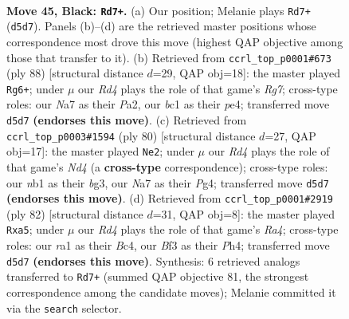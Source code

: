 \documentclass[11pt]{article}
\begin{document}
\clearpage

\begin{figure}[p]\centering
\begin{subfigure}{0.46\textwidth}\centering
\resizebox{\linewidth}{!}{%
\newchessgame
\chessboard[
  setfen={7k/n1P2K1p/p7/P2r1p2/4p3/5bP1/8/RNB5 b - - 0 45},
  showmover=false,
  pgfstyle=straightmove, color=movearrow, markmove={d5-d7}
]}
\caption{}
\end{subfigure}\hfill
\begin{subfigure}{0.46\textwidth}\centering
\resizebox{\linewidth}{!}{%
\newchessgame
\chessboard[
  setfen={8/6R1/1n1k4/1r4p1/4p3/4P2P/P4PP1/6K1 w - - 8 45},
  showmover=false,
  pgfstyle=straightmove, color=movearrow, markmove={g7-g6}
]}
\caption{}
\end{subfigure}
\\[4pt]
\begin{subfigure}{0.46\textwidth}\centering
\resizebox{\linewidth}{!}{%
\newchessgame
\chessboard[
  setfen={4r3/p2R4/2p3k1/8/2PN2P1/1P2p1b1/P7/1K6 w - - 5 41},
  showmover=false,
  pgfstyle=straightmove, color=movearrow, markmove={d4-e2}
]}
\caption{}
\end{subfigure}\hfill
\begin{subfigure}{0.46\textwidth}\centering
\resizebox{\linewidth}{!}{%
\newchessgame
\chessboard[
  setfen={3r4/6pk/5p2/p6p/R1B1Pb1P/5P2/5KP1/8 w - - 0 42},
  showmover=false,
  pgfstyle=straightmove, color=movearrow, markmove={a4-a5}
]}
\caption{}
\end{subfigure}
\caption{\textbf{Move 45, Black: \texttt{Rd7+}.} (a) Our position; Melanie plays \texttt{Rd7+} (\texttt{d5d7}). Panels (b)--(d) are the retrieved master positions whose correspondence most drove this move (highest QAP objective among those that transfer to it). (b) Retrieved from \texttt{ccrl\_top\_p0001\#673} (ply 88) [structural distance $d$=29, QAP obj=18]: the master played \texttt{Rg6+}; under $\mu$ our \emph{Rd4} plays the role of that game's \emph{Rg7}; cross-type roles: our \emph{N}a7 as their \emph{P}a2, our \emph{b}c1 as their \emph{p}e4; transferred move \texttt{d5d7} \textbf{(endorses this move)}. (c) Retrieved from \texttt{ccrl\_top\_p0003\#1594} (ply 80) [structural distance $d$=27, QAP obj=17]: the master played \texttt{Ne2}; under $\mu$ our \emph{Rd4} plays the role of that game's \emph{Nd4} (a \textbf{cross-type} correspondence); cross-type roles: our \emph{n}b1 as their \emph{b}g3, our \emph{N}a7 as their \emph{P}g4; transferred move \texttt{d5d7} \textbf{(endorses this move)}. (d) Retrieved from \texttt{ccrl\_top\_p0001\#2919} (ply 82) [structural distance $d$=31, QAP obj=8]: the master played \texttt{Rxa5}; under $\mu$ our \emph{Rd4} plays the role of that game's \emph{Ra4}; cross-type roles: our \emph{r}a1 as their \emph{B}c4, our \emph{B}f3 as their \emph{P}h4; transferred move \texttt{d5d7} \textbf{(endorses this move)}. Synthesis: 6 retrieved analogs transferred to \texttt{Rd7+} (summed QAP objective 81, the strongest correspondence among the candidate moves); Melanie committed it via the \texttt{search} selector.}
\label{fig:thought-m89}
\end{figure}
\end{document}
